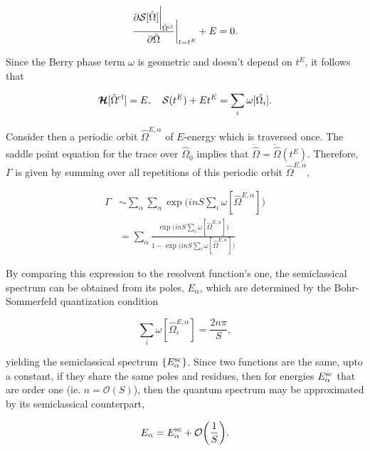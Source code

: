 \documentclass{homework}
\begin{document}
\begin{equation}
    \frac{\partial\mathcal{S}[\hat{\Omega}]\bigg|_{\hat{\Omega}^{\textnormal{cl}}}}{\partial  \hat{\Omega}}\bigg|_{t = t^E} + E = 0. 
\end{equation}

Since the Berry phase term $\omega$ is geometric and doesn't depend on $t^E$, it follows that 

\begin{equation}
    \bm{\mathcal{H}}[\hat{\Omega}^{\textnormal{cl}}] = E, \quad \mathcal{S}(t^E) + Et^E = \sum_{i} \omega[\hat{\Omega_i}].
\end{equation}

Consider then a periodic orbit $\hat{\Omega}^{E, \alpha}$ of $E$-energy which is traversed once. The saddle point equation for the trace over $\hat{\Omega}_0$ implies that 
$\dot{\hat{\Omega}} = \dot{\hat{\Omega}}(t^E)$. Therefore, $\Gamma$ is given by summing over all repetitions of this periodic orbit $\hat{\Omega}^{E, \alpha}$,

\begin{equation}
    \begin{split}
        \Gamma &\sim \sum_{\alpha} \sum_{n} \exp \bigg(in S \sum_{i} \omega[\hat{\Omega}^{E, \alpha}]\bigg) \\
        &= \sum_{\alpha} \frac{\exp \bigg(in S \sum_{i} \omega[\hat{\Omega}^{E, \alpha}]\bigg)}{1-\exp \bigg(in S \sum_{i} \omega[\hat{\Omega}^{E, \alpha}]\bigg)}
    \end{split}
\end{equation}

By comparing this expression to the resolvent function's one, the semiclassical spectrum can be obtained from its poles, $E_{\alpha}$, which are determined by the Bohr-Sommerfeld quantization condition 

\begin{equation}
    \sum_{i} \omega[\hat{\Omega}_i^{E, \alpha}] = \frac{2n\pi}{S},
\end{equation}

yielding the semiclassical spectrum $\{E_{\alpha}^{\textnormal{sc}}\}$. Since two functions are the same, upto a constant, if they share the same poles and residues, then for energies $E_{\alpha}^{\textnormal{sc}}$ that are order one (ie. $n = \mathcal{O}(S)$), then the quantum spectrum may be approximated by its semiclassical counterpart,

\begin{equation}
    E_{\alpha} = E_{\alpha}^{\textnormal{sc}} + \mathcal{O}\bigg(\frac{1}{S}\bigg).
\end{equation}
\end{document}
